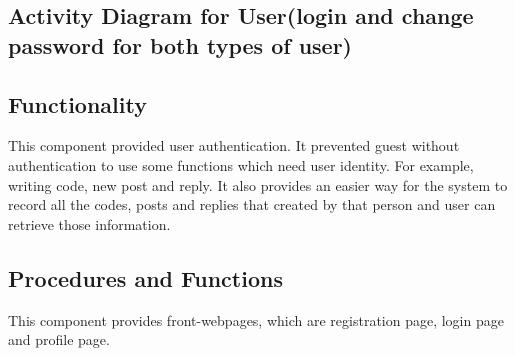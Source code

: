 \subsection{Activity Diagram for User(login and change password for both types of user)}
\begin{figure}[H]
 \label{5}
 \end{figure}

\subsection{Functionality}
This component provided user authentication. It prevented guest without authentication to use some functions which need user identity. For example, writing code, new post and reply. It also provides an easier way for the system to record all the codes, posts and replies that created by that person and user can retrieve those information.

\subsection{Procedures and Functions}
This component provides front-webpages, which are registration page, login page and profile page.

